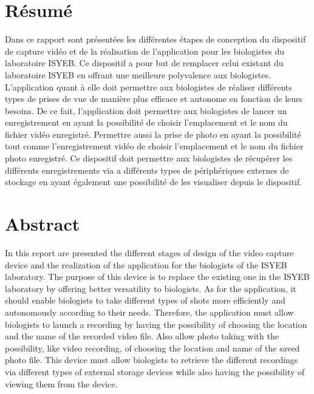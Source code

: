 \vspace*{\fill}
    \section*{Résumé}
        Dans ce rapport sont présentées les différentes étapes de conception du dispositif de capture vidéo et de la réalisation de l'application pour les biologistes du laboratoire ISYEB.
        Ce dispositif a pour but de remplacer celui existant du laboratoire ISYEB en offrant une meilleure polyvalence aux biologistes.
        L'application quant à elle doit permettre aux biologistes de réaliser différents types de prises de vue de manière plus efficace et autonome en fonction de leurs besoins.
        De ce fait, l'application doit permettre aux biologistes de lancer un enregistrement en ayant la possibilité de choisir l'emplacement et le nom du fichier vidéo enregistré. Permettre aussi la prise de photo en ayant la possibilité tout comme l'enregistrement vidéo de choisir l'emplacement et le nom du fichier photo enregistré.
        Ce dispositif doit permettre aux biologistes de récupérer les différents enregistrements via a différents types de périphériques externes de stockage en ayant également une possibilité de les visualiser depuis le dispositif.



    \section*{Abstract}
        In this report are presented the different stages of design of the video capture device and the realization of the application for the biologists of the ISYEB laboratory.
        The purpose of this device is to replace the existing one in the ISYEB laboratory by offering better versatility to biologists.
        As for the application, it should enable biologists to take different types of shots more efficiently and autonomously according to their needs.
        Therefore, the application must allow biologists to launch a recording by having the possibility of choosing the location and the name of the recorded video file. Also allow photo taking with the possibility, like video recording, of choosing the location and name of the saved photo file.
        This device must allow biologists to retrieve the different recordings via different types of external storage devices while also having the possibility of viewing them from the device.
\vspace*{\fill}